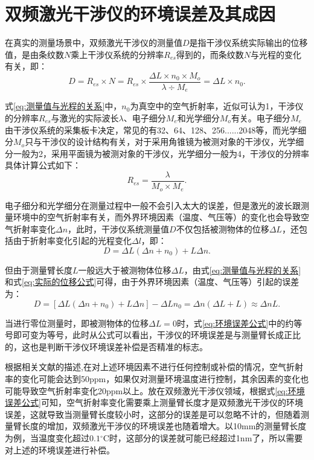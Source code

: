 \section{双频激光干涉仪的环境误差及其成因}
在真实的测量场景中，双频激光干涉仪的测量值\(D\)是指干涉仪系统实际输出的位移值，是由条纹数\(N\)乘上干涉仪系统的分辨率\(R_{es}\)得到的，而条纹数\(N\)与光程的变化有关，即：
\begin{equation}\label{eq:测量值与光程的关系}
    D=R_{es}{\times}N=R_{es}{\times}\frac{\Delta L{\times}n_0{\times}M_o}{\lambda{\div}M_e}=\Delta L{\times}n_0.
\end{equation}

式\eqref{eq:测量值与光程的关系}中，\(n_0\)为真空中的空气折射率，近似可认为1，干涉仪的分辨率\(R_{es}\)与激光的实际波长\(\lambda\)、电子细分\(M_e\)和光学细分\(M_o\)有关。电子细分\(M_e\)由干涉仪系统的采集板卡决定，常见的有32、64、128、256......2048等，而光学细分\(M_o\)只与干涉仪的设计结构有关，对于采用角锥镜为被测对象的干涉仪，光学细分一般为2，采用平面镜为被测对象的干涉仪，光学细分一般为4，干涉仪的分辨率具体计算公式如下：
\begin{equation}\label{eq:分辨率与细分的关系}
    R_{es}=\frac{\lambda}{M_o{\times}M_e}.
\end{equation}

电子细分和光学细分在测量过程中一般不会引入太大的误差，但是激光的波长跟测量环境中的空气折射率有关，而外界环境因素（温度、气压等）的变化也会导致空气折射率变化\(\Delta n\)，此时，干涉仪系统测量值\(D\)不仅包括被测物体的位移\(\Delta L\)，还包括由于折射率变化引起的光程变化\(\Delta l\)，即：
\begin{equation}\label{eq:实际的位移公式}
    D=\Delta L(\Delta n+n_0)+L\Delta n.
\end{equation}

但由于测量臂长度\(L\)一般远大于被测物体位移\(\Delta L\)，由式\eqref{eq:测量值与光程的关系}和式\eqref{eq:实际的位移公式}可得，由于外界环境因素（温度、气压等）引起的误差为：
\begin{equation}\label{eq:环境误差公式}
    D=[\Delta L(\Delta n+n_0)+L\Delta n]-\Delta Ln_0=\Delta n(\Delta L+L) \approx \Delta n L.
\end{equation}

当进行零位测量时，即被测物体的位移$\Delta L = 0$时，式\eqref{eq:环境误差公式}中的约等号即可变为等号，此时从公式可以看出，干涉仪的环境误差是与测量臂长成正比的，这也是判断干涉仪环境误差补偿是否精准的标志。

根据相关文献的描述\cite{徐建2013双频激光干涉仪系统线性测量误差主要来源及减小误差的方法分析},在对上述环境因素不进行任何控制或补偿的情况，空气折射率的变化可能会达到50ppm，如果仅对测量环境温度进行控制，其余因素的变化也可能导致空气折射率变化20ppm以上。放在双频激光干涉仪领域，根据式\eqref{eq:环境误差公式}可知，空气折射率变化需要乘上测量臂长度才是双频激光干涉仪的环境误差，这就导致当测量臂长度较小时，这部分的误差是可以忽略不计的，但随着测量臂长度的增加，双频激光干涉仪的环境误差也随着增大。以10mm的测量臂长度为例，当温度变化超过\(0.1\)$^{\circ} \mathrm{C}$时，这部分的误差就可能已经超过1nm了，所以需要对上述的环境误差进行补偿。

